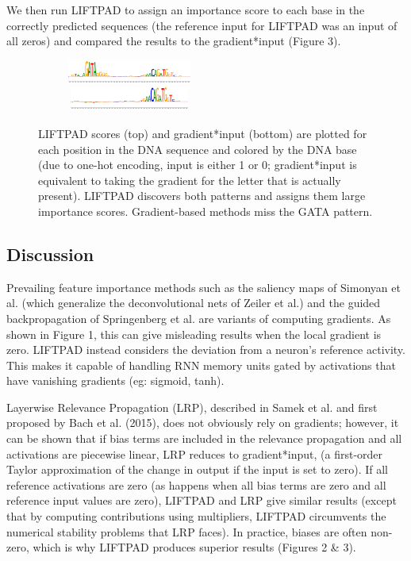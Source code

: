 \documentclass{article}
\begin{document}
We then run LIFTPAD to assign an importance score to each base in the correctly predicted sequences (the reference input for LIFTPAD was an input of all zeros) and compared the results to the gradient*input (Figure 3).

\begin{figure}[!ht]
\vspace{-10px}
\begin{center}
\includegraphics[width=230px,height=30px]{LIFTPADSequence2.png}
\includegraphics[width=230px,height=30px]{GradientSequence2.png}
\caption{LIFTPAD scores (top) and gradient*input (bottom) are plotted for each position in the DNA sequence and colored by the DNA base (due to one-hot encoding, input is either 1 or 0; gradient*input is equivalent to taking the gradient for the letter that is actually present). LIFTPAD discovers both patterns and assigns them large importance scores. Gradient-based methods miss the GATA pattern.}
\end{center}
\vspace{-20px}
\end{figure}
\subsection{Discussion}

Prevailing feature importance methods such as the saliency maps of Simonyan et al. (which generalize the deconvolutional nets of Zeiler et al.) and the guided backpropagation of Springenberg et al. are variants of computing gradients. As shown in Figure 1, this can give misleading results when the local gradient is zero. LIFTPAD instead considers the deviation from a neuron's reference activity. This makes it capable of handling RNN memory units gated by activations that have vanishing gradients (eg: sigmoid, tanh).

Layerwise Relevance Propagation (LRP), described in Samek et al. and first proposed by Bach et al. (2015), does not obviously rely on gradients; however, it can be shown that if bias terms are included in the relevance propagation and all activations are piecewise linear, LRP reduces to gradient*input, (a first-order Taylor approximation of the change in output if the input is set to zero). If all reference activations are zero (as happens when all bias terms are zero and all reference input values are zero), LIFTPAD and LRP give similar results (except that by computing contributions using multipliers, LIFTPAD circumvents the numerical stability problems that LRP faces). In practice, biases are often non-zero, which is why LIFTPAD produces superior results (Figures 2 \& 3).
\end{document}
